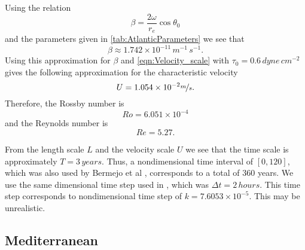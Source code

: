 Using the relation
\begin{equation}
  \beta = \frac{2\omega}{r_e}\cos \theta_0
  \label{eqn:Beta}
\end{equation}
and the parameters given in \autoref{tab:AtlanticParameters} we see that
\begin{equation*}
  \beta \approx 1.742\times 10^{-11}\, m^{-1}\,s^{-1}.
\end{equation*}
Using this approximation for $\beta$ and \eqref{eqn:Velocity_scale} with
{\color{red}$\tau_0 = 0.6\, dyne\, cm^{-2}$ \cite{Hellerman} gives the following
approximation for the characteristic velocity
\begin{equation*}
    U = 1.054\times 10^{-2} \nicefrac{m}{s}.
\end{equation*}
Therefore, the Rossby number is
\begin{equation*}
  Ro = 6.051\times 10^{-4}
\end{equation*}
and the Reynolds number is
\begin{equation*}
  Re = 5.27.
\end{equation*}}

From the length scale $L$ and the velocity scale $U$ we see that the time scale
is approximately $T = 3\, years$. Thus, a nondimensional time interval of
$[0,120]$, which was also used by Bermejo et al \cite{delSastre04}, corresponds
to a total of $360$ years. We use the same dimensional time step used in
\cite{delSastre04}, which was $\Delta t = 2\, hours$. This time step corresponds
to nondimensional time step of $k = 7.6053 \times 10^{-5}$. {\color{red} This
may be unrealistic.}

\subsection{Mediterranean}

